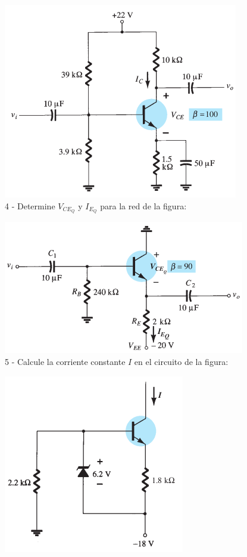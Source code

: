\documentclass[10pt,letterpaper]{article}
\begin{document}
		\includegraphics[scale=0.6]{c4.png} \\

	4 - Determine $V_{CE_{Q}}$ y $I_{E_{Q}}$ para la red de la figura:
		
		\includegraphics[scale=0.7]{c3.png} \\

	5 - Calcule la corriente constante $I$ en el circuito de la figura:
	
		\includegraphics[scale=0.7]{c5.png}
\end{document}
